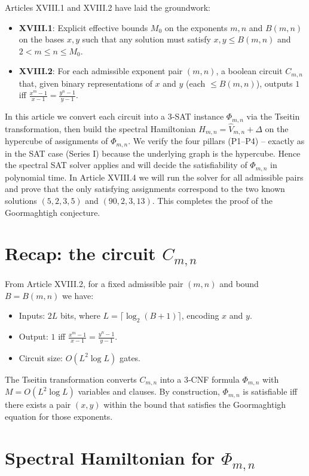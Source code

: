\documentclass[11pt,a4paper]{article}
\begin{document}
Articles XVIII.1 and XVIII.2 have laid the groundwork:
\begin{itemize}
\item \textbf{XVIII.1}: Explicit effective bounds \(M_0\) on the exponents \(m,n\) and \(B(m,n)\) on the bases \(x,y\) such that any solution must satisfy \(x,y\le B(m,n)\) and \(2<m\le n\le M_0\).
\item \textbf{XVIII.2}: For each admissible exponent pair \((m,n)\), a boolean circuit \(C_{m,n}\) that, given binary representations of \(x\) and \(y\) (each \(\le B(m,n)\)), outputs \(1\) iff \(\frac{x^{m}-1}{x-1} = \frac{y^{n}-1}{y-1}\).
\end{itemize}
In this article we convert each circuit into a 3‑SAT instance \(\Phi_{m,n}\) via the Tseitin transformation, then build the spectral Hamiltonian \(H_{m,n} = \hat{V}_{m,n} + \Delta\) on the hypercube of assignments of \(\Phi_{m,n}\). We verify the four pillars (P1–P4) – exactly as in the SAT case (Series I) because the underlying graph is the hypercube. Hence the spectral SAT solver applies and will decide the satisfiability of \(\Phi_{m,n}\) in polynomial time. In Article XVIII.4 we will run the solver for all admissible pairs and prove that the only satisfying assignments correspond to the two known solutions \((5,2,3,5)\) and \((90,2,3,13)\). This completes the proof of the Goormaghtigh conjecture.

\section{Recap: the circuit \(C_{m,n}\)}

From Article XVIII.2, for a fixed admissible pair \((m,n)\) and bound \(B = B(m,n)\) we have:
\begin{itemize}
\item Inputs: \(2L\) bits, where \(L = \lceil \log_2(B+1)\rceil\), encoding \(x\) and \(y\).
\item Output: \(1\) iff \(\frac{x^{m}-1}{x-1} = \frac{y^{n}-1}{y-1}\).
\item Circuit size: \(O(L^2 \log L)\) gates.
\end{itemize}

The Tseitin transformation converts \(C_{m,n}\) into a 3‑CNF formula \(\Phi_{m,n}\) with \(M = O(L^2 \log L)\) variables and clauses. By construction, \(\Phi_{m,n}\) is satisfiable iff there exists a pair \((x,y)\) within the bound that satisfies the Goormaghtigh equation for those exponents.

\section{Spectral Hamiltonian for \(\Phi_{m,n}\)}
\end{document}
